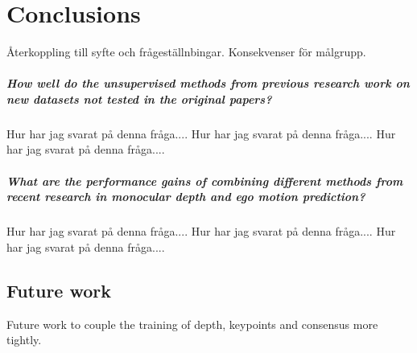 \chapter{Conclusions}\label{cha:conclusions}

Återkoppling till syfte och frågeställnbingar. Konsekvenser för målgrupp.

\paragraph{\textbf{How well do the unsupervised methods from previous research work on new datasets not tested in the original papers?}} Hur har jag svarat på denna fråga.... Hur har jag svarat på denna fråga.... Hur har jag svarat på denna fråga....

\paragraph{\textbf{What are the performance gains of combining different methods from recent research in monocular depth and ego motion prediction?}} Hur har jag svarat på denna fråga.... Hur har jag svarat på denna fråga.... Hur har jag svarat på denna fråga....

\section{Future work}

Future work to couple the training of depth, keypoints and consensus more tightly.